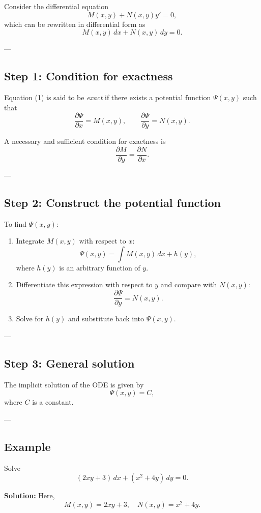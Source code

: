 \documentclass[12pt]{book}
\begin{document}
Consider the differential equation
\[
M(x,y) + N(x,y) y' = 0,
\]
which can be rewritten in differential form as
\[
M(x,y)\,dx + N(x,y)\,dy = 0. \tag{1}
\]

---

\subsection*{Step 1: Condition for exactness}
Equation (1) is said to be \emph{exact} if there exists a potential function $\Psi(x,y)$ such that
\[
\frac{\partial \Psi}{\partial x} = M(x,y), 
\qquad 
\frac{\partial \Psi}{\partial y} = N(x,y).
\]

A necessary and sufficient condition for exactness is
\[
\frac{\partial M}{\partial y} = \frac{\partial N}{\partial x}. \tag{2}
\]

---

\subsection*{Step 2: Construct the potential function}
To find $\Psi(x,y)$:
\begin{enumerate}
\item Integrate $M(x,y)$ with respect to $x$:
\[
\Psi(x,y) = \int M(x,y)\,dx + h(y),
\]
where $h(y)$ is an arbitrary function of $y$.

\item Differentiate this expression with respect to $y$ and compare with $N(x,y)$:
\[
\frac{\partial \Psi}{\partial y} = N(x,y).
\]

\item Solve for $h(y)$ and substitute back into $\Psi(x,y)$.
\end{enumerate}

---

\subsection*{Step 3: General solution}
The implicit solution of the ODE is given by
\[
\Psi(x,y) = C,
\]
where $C$ is a constant.

---

\subsection*{Example}
Solve
\[
(2xy + 3)\,dx + (x^2 + 4y)\,dy = 0.
\]

\textbf{Solution:} Here,
\[
M(x,y) = 2xy + 3, 
\quad N(x,y) = x^2 + 4y.
\]
\end{document}

